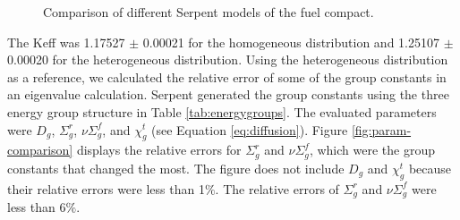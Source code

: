 \begin{figure}[htbp!]
  \centering
  \hfill
  \caption{Comparison of different Serpent models of the fuel compact.}
  \label{fig:compact-model}
\end{figure}

The \gls{Keff} was 1.17527 $\pm$ 0.00021 for the homogeneous distribution and 1.25107 $\pm$ 0.00020 for the heterogeneous distribution.
Using the heterogeneous distribution as a reference, we calculated the relative error of some of the group constants in an eigenvalue calculation.
Serpent generated the group constants using the three energy group structure in Table \ref{tab:energygroups}.
The evaluated parameters were $D_g$, $\Sigma^r_g$, $\nu\Sigma^f_g$, and $\chi^t_g$ (see Equation \ref{eq:diffusion}).
Figure \ref{fig:param-comparison} displays the relative errors for $\Sigma^r_g$ and $\nu\Sigma^f_g$, which were the group constants that changed the most.
The figure does not include $D_g$ and $\chi^t_g$ because their relative errors were less than 1$\%$.
The relative errors of $\Sigma^r_g$ and $\nu\Sigma^f_g$ were less than 6$\%$.

